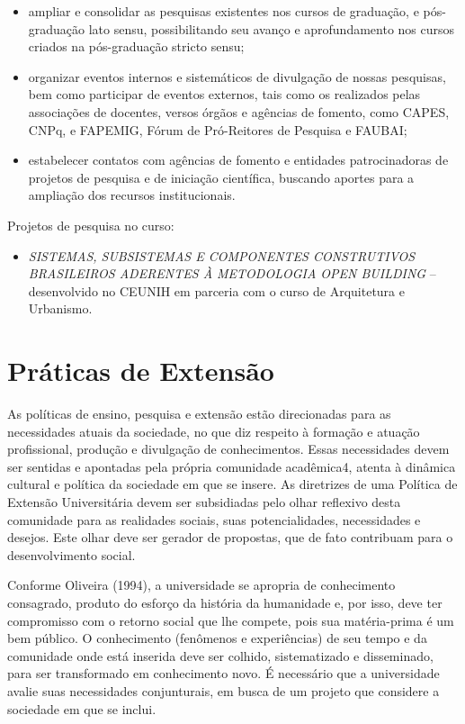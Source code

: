 \documentclass[a4paper, 12pt, openright, oneside, german, french, english, brazil]{abntex2}
\begin{document}
\begin{itemize}
\item ampliar e consolidar as pesquisas existentes nos cursos de graduação, e pós-graduação lato sensu, possibilitando seu avanço e aprofundamento nos cursos criados na pós-graduação stricto sensu;
\item organizar eventos internos e sistemáticos de divulgação de nossas pesquisas, bem como participar de eventos externos, tais como os realizados pelas associações de docentes, versos órgãos e agências de fomento, como CAPES, CNPq, e FAPEMIG, Fórum de Pró-Reitores de Pesquisa e FAUBAI;
\item estabelecer contatos com agências de fomento e entidades patrocinadoras de projetos de pesquisa e de iniciação científica, buscando aportes para a ampliação dos recursos institucionais.
\end{itemize}

Projetos de pesquisa no curso:

\begin{itemize}
\item \textit{SISTEMAS, SUBSISTEMAS E COMPONENTES CONSTRUTIVOS BRASILEIROS ADERENTES À METODOLOGIA OPEN BUILDING} -- desenvolvido no CEUNIH em parceria com o curso de Arquitetura e Urbanismo.
\end{itemize}

\chapter{Práticas de Extensão}

As políticas de ensino, pesquisa e extensão estão direcionadas para as necessidades atuais da sociedade, no que diz respeito à formação e atuação profissional, produção e divulgação de conhecimentos. Essas necessidades devem ser sentidas e apontadas pela própria comunidade acadêmica4, atenta à dinâmica cultural e política da sociedade em que se insere. As diretrizes de uma Política de Extensão Universitária devem ser subsidiadas pelo olhar reflexivo desta comunidade para as realidades sociais, suas potencialidades, necessidades e desejos. Este olhar deve ser gerador de propostas, que de fato contribuam para o desenvolvimento social.

Conforme Oliveira (1994), a universidade se apropria de conhecimento consagrado, produto do esforço da história da humanidade e, por isso, deve ter compromisso com o retorno social que lhe compete, pois sua matéria-prima é um bem público. O conhecimento (fenômenos e experiências) de seu tempo e da comunidade onde está inserida deve ser colhido, sistematizado e disseminado, para ser transformado em conhecimento novo. É necessário que a universidade avalie suas necessidades conjunturais, em busca de um projeto que considere a sociedade em que se inclui.
\end{document}
